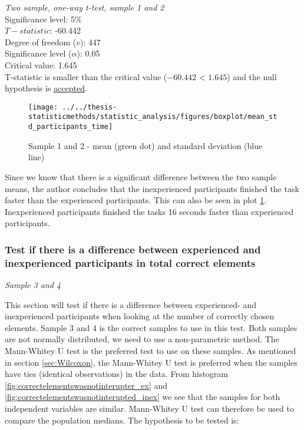  \begin{center}
	\begin{tcolorbox}[width=0.8\textwidth]
		\centering
		\textit{Two sample, one-way t-test, sample 1 and 2}\\
		Significance level: 5\%  \\[0.5cm]
		
		$T-statistic$: -60.442 \\
		Degree of freedom ($v$): 447 \\ %
		Significance level ($\alpha$): 0.05 \\
		Critical value: 1.645\\[0.2cm]
		
		T-statistic is smaller than the critical value ($-60.442$ < $1.645$) and the null hypothesis is \underline{accepted}.\\[0.5cm]
	\end{tcolorbox} 
\end{center}

\begin{figure}[H]
	\centering
	\texttt{[image: ../../thesis-statisticmethods/statistic\_analysis/figures/boxplot/mean\_std\_participants\_time]}
	\caption{Sample 1 and 2 - mean (green dot) and standard deviation (blue line)}
	\label{fig:meanstdparticipantstime}
\end{figure}

Since we know that there is a significant difference between the two sample means, the author concludes that the inexperienced participants finished the task faster than the experienced participants. This can also be seen in plot \ref{fig:meanstdparticipantstime}. Inexperienced participants finished the tasks 16 seconds faster than experienced participants. \newline

\subsubsection[Sample 3, 4]{Test if there is a difference between experienced and inexperienced participants in total correct elements} %
\textit{Sample 3 and 4}\newline

This section will test if there is a difference between experienced- and inexperienced participants when looking at the number of correctly chosen elements. Sample 3 and 4 is the correct samples to use in this test. Both samples are not normally distributed, we need to use a non-parametric method. The Mann-Whitey U test is the preferred test to use on these samples. As mentioned in section \ref{sec:Wilcoxon}, the Mann-Whitey U test is preferred when the samples have ties (identical observations) in the data. From histogram \ref{fig:correctelementswasnotinterupter_ex} and \ref{fig:correctelementswasnotinterupted_inex} we see that the samples for both independent variables are similar. Mann-Whitey U test can therefore be used to compare the population medians. The hypothesis to be tested is:\\[0.3cm]


